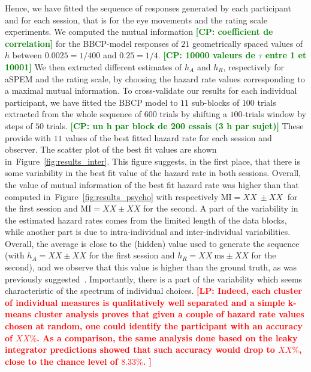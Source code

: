 \documentclass[12pt,english]{article}%
\newcommand{\ms}{\si{\milli\second}}%
\newcommand{\citep}[1]{\parencite{#1}}
\newcommand{\seeFig}[1]{Figure~\ref{fig:#1}}
\newcommand{\LP}[1]{\textbf{\textcolor{red}{[LP: #1]}}}
\newcommand{\CP}[1]{\textbf{\textcolor{green}{[CP: #1]}}}
\begin{document}
Hence, we have fitted the sequence of responses generated by each participant and
for each session, that is for the eye movements and the rating scale experiments.
We computed the mutual information
\CP{coefficient de correlation}
for the BBCP-model responses of $21$ geometrically spaced values of $h$ between $0.0025=1/400$ and $0.25=1/4$. \CP{10000 valeurs de $\tau$ entre 1 et 10001}
We then extracted different estimates of $h_A$ and $h_R$,
respectively for aSPEM and the rating scale,
by choosing the hazard rate values corresponding to a maximal mutual information.
To cross-validate our results for each individual participant,
we have fitted the BBCP model to $11$ sub-blocks of $100$ trials 
extracted from the whole sequence of $600$ trials 
by shifting a $100$-trials window by steps of $50$ trials. \CP{un h par block de 200 essais (3 h par sujet)}
These provide with $11$ values of the best fitted hazard rate for each session and observer.
The scatter plot of the best fit values are shown in~\seeFig{results_inter}.
This figure suggests, in the first place, that there is some variability
in the best fit value of the hazard rate in both sessions.
Overall, the value of mutual information of the best fit hazard rate
was higher than that computed in~\seeFig{results_psycho}
with respectively $\text{MI} = XX~ \pm XX~$ for the first session and
$\text{MI} = XX \pm XX$ for the second.
A part of the variability in the estimated hazard rates comes 
from the limited length of the data blocks,
while another part is due to intra-individual and inter-individual variabilities.
Overall, the average is close to the (hidden) value used to generate the sequence
(with $h_A = XX \pm XX$ for the first session and
$h_R = XX~\ms \pm XX$ for the second),
and we observe that this value is higher than the ground truth,
as was previously suggested~\citep{Meyniel??}.
Importantly, there is a part of the variability
which seems characteristic of the spectrum of individual choices.
\LP{
Indeed, each cluster of individual measures is qualitatively well separated and
a simple k-means cluster analysis proves that
given a couple of hazard rate values chosen at random,
one could identify the participant with an accuracy of $XX\%$.
As a comparison, the same analysis done based on the leaky integrator predictions
showed that such accuracy would drop to $XX\%$,
close to the chance level of $8.33\%$.
}
\end{document}
